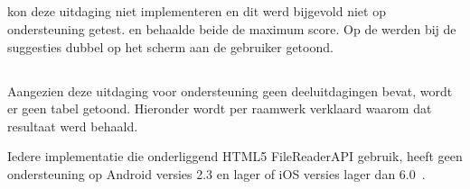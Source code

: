 \subsection{}
\label{sec:evaluatie-ondersteuning-autoaanvullen}

\st{} kon deze uitdaging niet implementeren en dit werd bijgevold niet op ondersteuning getest.
\kendo{} en \jqm{} behaalde beide de maximum score.
Op de \htc{} werden bij \lungo{} de suggesties dubbel op het scherm aan de gebruiker getoond.

% 
% 
% 

\subsection{}
\label{sec:evaluatie-ondersteuning-afbeelding}

Aangezien deze uitdaging voor ondersteuning geen deeluitdagingen bevat, wordt er geen tabel getoond.
Hieronder wordt per raamwerk verklaard waarom dat resultaat werd behaald.

Iedere implementatie die onderliggend HTML5 FileReaderAPI gebruik, heeft geen ondersteuning op Android versies 2.3 en lager of iOS versies lager dan 6.0~\cite{Deveria2013c}.

